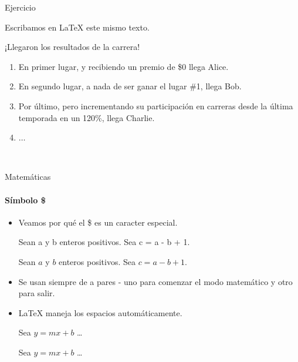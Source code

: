 \begin{frame}[fragile]{Ejercicio}

    Escribamos en \LaTeX{}  este mismo texto.

    \begin{tcolorbox}[colframe=color1]
        \begin{center}
            ¡Llegaron los resultados de la carrera!
            \begin{enumerate}
            \item En primer lugar, y recibiendo un premio de \$0 llega Alice.
            \item En segundo lugar, a nada de ser ganar el lugar \#1, llega Bob.
            \item Por último, pero incrementando su participación en carreras desde la última temporada en un 120\%, llega Charlie.
            \item $\ldots$
            \end{enumerate}
        \end{center}
    \end{tcolorbox}
    
    \    
    
    \begin{center}
    \end{center}
    
\end{frame}

\begin{frame}[fragile]{Matemáticas}
    \framesubtitle{Símbolo \$}
    \begin{itemize}
        \item Veamos por qué el \$ es un caracter especial.
        \small
        \begin{exampletwouptiny}
Sean a y b enteros positivos. 
Sea c = a - b + 1.

Sean $a$ y $b$ enteros positivos. 
Sea $c = a - b + 1$.
        \end{exampletwouptiny}
        \item Se usan siempre de a pares - uno para comenzar el modo matemático y otro para salir.
        \item \LaTeX{} maneja los espacios automáticamente.
            \begin{exampletwouptiny}
Sea $y=mx+b$ \ldots

Sea $y = m x + b$ \ldots
        \end{exampletwouptiny}
    \end{itemize}
\end{frame}

